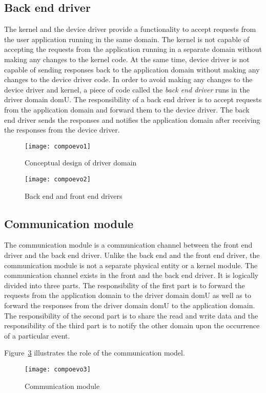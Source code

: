 \subsection{Back end driver}
\label{subsec:backend}
The kernel and the device driver provide a functionality to accept requests from the user application running in the same domain. The kernel is not capable of accepting the requests from the application running in a separate domain without making any changes to the kernel code. At the same time, device driver is not capable of sending responses back to the application domain without making any changes to the device driver code. In order to avoid making any changes to the device driver and kernel, a piece of code called the \textit{back end driver} runs in the driver domain domU. The responsibility of a back end driver is to accept requests from the application domain and forward them to the device driver. The back end driver sends the responses and notifies the application domain after receiving the responses from the device driver.
\begin{figure}[!ht]
\centering
\texttt{[image: compoevo1]}
\caption{Conceptual design of driver domain}
\label{fig:conept}
\end{figure}
\begin{figure}[!ht]
\centering
\texttt{[image: compoevo2]}
\caption{Back end and front end drivers}
\label{fig:backendfrontend}
\end{figure}

\subsection{Communication module}
The communication module is a communication channel between the front end driver and the back end driver. Unlike the back end and the front end driver, the communication module is not a separate physical entity or a kernel module. The communication channel exists in the front and the back end driver. It is logically divided into three parts. The responsibility of the first part is to forward the requests from the application domain to the driver domain domU as well as to forward the responses from the driver domain domU to the application domain. The responsibility of the second part is to share the read and write data and the responsibility of the third part is to notify the other domain upon the occurrence of a particular event. 

Figure~\ref{fig:communication} illustrates the role of the communication model. 
\begin{figure}[!ht]
\centering
\texttt{[image: compoevo3]}
\caption{Communication module}
\label{fig:communication}
\end{figure}
\pagebreak

